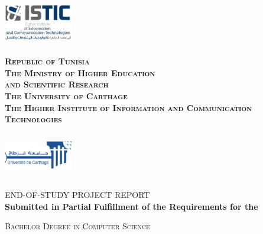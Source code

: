 \begin{titlepage}

\newcommand{\HRule}{\rule{\linewidth}{0.5mm}} %

\center %
 


\begin{minipage}[l]{0.2\columnwidth}
\includegraphics[width=3cm,height=2cm]{assets/logo_istic.jpg}\\
\end{minipage}
\hfill
\begin{minipage}[l]{0.5\columnwidth}
\centering
\footnotesize
\textbf{\textsc{Republic of Tunisia}}\\
\textbf{\textsc{The Ministry of Higher Education \\
and Scientific Research}}\\
\medskip 
\textbf{\textsc{The University of Carthage}}\\
\medskip 
\textbf{\textsc{The Higher Institute of Information and Communication Technologies}}
\end{minipage}
\hfill
\begin{minipage}[l]{0.2\columnwidth}
\includegraphics[width=3cm,height=2cm]{assets/logo_ucar.jpg}\\
\end{minipage}

\vskip1cm
\textsc{\large END-OF-STUDY PROJECT REPORT}\\[0.5cm] %

\textbf{Submitted in Partial Fulfillment of the  Requirements for the }

\textsc{\large Bachelor Degree in Computer Science
}\\[0.5cm] %


\end{titlepage}

